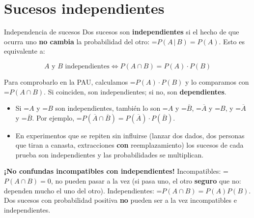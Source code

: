\documentclass[11pt,a4paper]{article}
\newcommand{\fmm}[1]{\setbox0=\hbox{$#1$}\ifdim\wd0>\linewidth\[#1\]\else\mbox{\box0}\fi}
\newcommand{\fmuline}[1]{\textbf{\color{fmaccent}#1}}
\begin{document}
  
\section{Sucesos independientes}\hypertarget{sec8}{}

  

  
\begin{fmdef}{Independencia de sucesos}
Dos sucesos son \textbf{independientes} si el hecho de que ocurra uno \textbf{no cambia} la probabilidad del otro: \fmm{P(A\,|\,B)=P(A)}. Esto es equivalente a:

      
\[A \text{ y } B \text{ independientes}\iff P(A\cap B)=P(A)\cdot P(B)\]

      

Para comprobarlo en la PAU, calculamos \fmm{P(A)\cdot P(B)} y lo comparamos con \fmm{P(A\cap B)}. Si coinciden, son independientes; si no, son \textbf{dependientes}.

      
\begin{itemize}
\item Si \fmm{A} y \fmm{B} son independientes, también lo son \fmm{A} y \fmm{\overline{B}}, \fmm{\overline{A}} y \fmm{B}, y \fmm{\overline{A}} y \fmm{\overline{B}}. Por ejemplo, \fmm{P(\overline{A}\cap\overline{B})=P(\overline{A})\cdot P(\overline{B})}.
\item En experimentos que se repiten sin influirse (lanzar dos dados, dos personas que tiran a canasta, extracciones \textbf{con} reemplazamiento) los sucesos de cada prueba son independientes y las probabilidades se multiplican.
\end{itemize}

      
\begin{fmnote}\fmuline{¡No confundas incompatibles con independientes!} Incompatibles: \fmm{P(A\cap B)=0}, no pueden pasar a la vez (si pasa uno, el otro \textbf{seguro} que no: dependen mucho el uno del otro). Independientes: \fmm{P(A\cap B)=P(A)P(B)}. Dos sucesos con probabilidad positiva \textbf{no} pueden ser a la vez incompatibles e independientes.\end{fmnote}
\end{fmdef}
\end{document}
